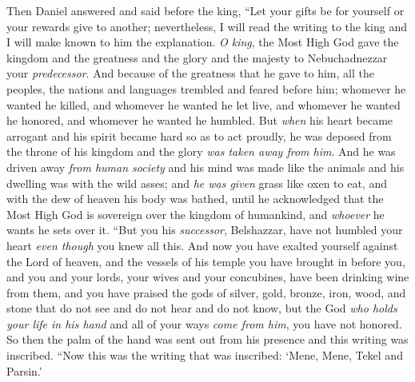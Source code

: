\begin{biblechapter}
\verse Then Daniel answered and said before the king, “Let your gifts be for yourself or your rewards give to another; nevertheless, I will read the writing to the king and I will make known to him the explanation.
\verse \textit{O king}, the Most High God gave the kingdom and the greatness and the glory and the majesty to Nebuchadnezzar your \textit{predecessor}.
\verse And because of the greatness that he gave to him, all the peoples, the nations and languages trembled and feared before him; whomever he wanted he killed, and whomever he wanted he let live, and whomever he wanted he honored, and whomever he wanted he humbled.
\verse But \textit{when} his heart became arrogant and his spirit became hard so as to act proudly, he was deposed from the throne of his kingdom and the glory \textit{was taken away from him}.
\verse And he was driven away \textit{from human society} and his mind was made like the animals and his dwelling was with the wild asses; and \textit{he was given} grass like oxen to eat, and with the dew of heaven his body was bathed, until he acknowledged that the Most High God is sovereign over the kingdom of humankind, and \textit{whoever} he wants he sets over it.
\verse “But you his \textit{successor}, Belshazzar, have not humbled your heart \textit{even though} you knew all this.
\verse And now you have exalted yourself against the Lord of heaven, and the vessels of his temple you have brought in before you, and you and your lords, your wives and your concubines, have been drinking wine from them, and you have praised the gods of silver, gold, bronze, iron, wood, and stone that do not see and do not hear and do not know, but the God \textit{who holds your life in his hand} and all of your ways \textit{come from him}, you have not honored.
\verse So then the palm of the hand was sent out from his presence and this writing was inscribed.
\verse “Now this was the writing that was inscribed: ‘Mene, Mene, Tekel and Parsin.’

\end{biblechapter}
